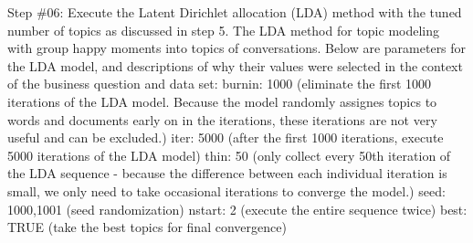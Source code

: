 \documentclass[]{article}
\newenvironment{Shaded}{\begin{snugshade}}{\end{snugshade}}
\newcommand{\KeywordTok}[1]{\textcolor[rgb]{0.13,0.29,0.53}{\textbf{#1}}}
\newcommand{\DataTypeTok}[1]{\textcolor[rgb]{0.13,0.29,0.53}{#1}}
\newcommand{\DecValTok}[1]{\textcolor[rgb]{0.00,0.00,0.81}{#1}}
\newcommand{\StringTok}[1]{\textcolor[rgb]{0.31,0.60,0.02}{#1}}
\newcommand{\CommentTok}[1]{\textcolor[rgb]{0.56,0.35,0.01}{\textit{#1}}}
\newcommand{\OtherTok}[1]{\textcolor[rgb]{0.56,0.35,0.01}{#1}}
\newcommand{\OperatorTok}[1]{\textcolor[rgb]{0.81,0.36,0.00}{\textbf{#1}}}
\newcommand{\NormalTok}[1]{#1}
\begin{document}
Step \#06: Execute the Latent Dirichlet allocation (LDA) method with the
tuned number of topics as discussed in step 5. The LDA method for topic
modeling with group happy moments into topics of conversations. Below
are parameters for the LDA model, and descriptions of why their values
were selected in the context of the business question and data set:
burnin: 1000 (eliminate the first 1000 iterations of the LDA model.
Because the model randomly assignes topics to words and documents early
on in the iterations, these iterations are not very useful and can be
excluded.) iter: 5000 (after the first 1000 iterations, execute 5000
iterations of the LDA model) thin: 50 (only collect every 50th iteration
of the LDA sequence - because the difference between each individual
iteration is small, we only need to take occasional iterations to
converge the model.) seed: 1000,1001 (seed randomization) nstart: 2
(execute the entire sequence twice) best: TRUE (take the best topics for
final convergence)

\begin{Shaded}
\end{Shaded}
\end{document}
